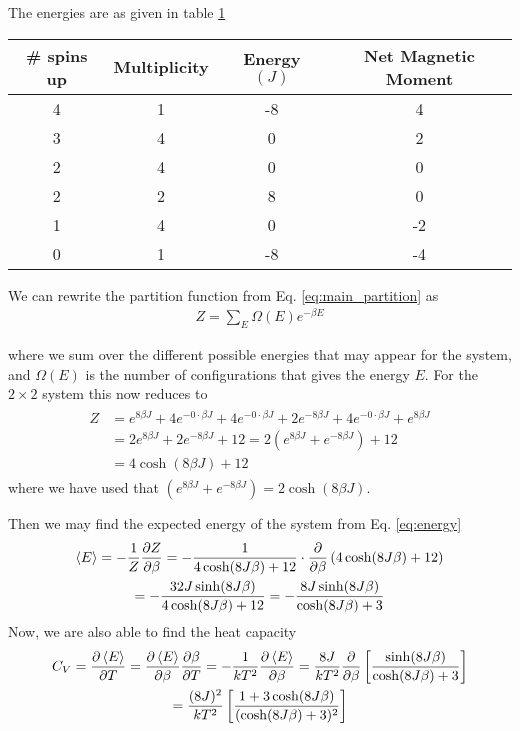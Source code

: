 \documentclass[11pt, a4paper]{article}
\newcommand{\pdiff}[2]{\frac{\partial #1}{\partial #2}}
\begin{document}
The energies are as given in table \ref{tab:energy}

\begin{table}[!ht]
\centering
\begin{tabular}{c|c|c|c}
\# spins up & Multiplicity & Energy $(J)$ & Net Magnetic Moment \\
\hline
4 & 1 & -8 & 4\\
3 & 4 & 0 & 2\\
2 & 4 & 0 & 0\\
2 & 2 & 8 & 0\\
1 & 4 & 0 & -2\\
0 & 1 & -8 & -4
\end{tabular}
\label{tab:energy}
\end{table}

We can rewrite the partition function from Eq. \eqref{eq:main_partition} as
\begin{gather}
Z = \sum\limits_E \Omega(E)e^{-\beta E}
\end{gather} 


where we sum over the different possible energies that may appear for the system, and $\Omega(E)$ is the number of configurations that gives the energy $E$. For the $2 \times 2$ system this now reduces to 
\begin{gather}
\begin{aligned}
Z &= e^{8\beta J} + 4 e^{-0\cdot\beta J} + 4e^{-0\cdot\beta J} + 2e^{-8\beta J} + 4e^{-0\cdot\beta J} + e^{8\beta J}\\
&= 2e^{8\beta J} + 2e^{-8\beta J} + 12 = 2(e^{8\beta J} + e^{-8\beta J}) + 12\\
&= 4\cosh(8\beta J) + 12
\end{aligned}
\end{gather}
where we have used that $(e^{8\beta J} + e^{-8\beta J}) = 2\cosh(8\beta J)$.

Then we may find the expected energy of the system from Eq. \eqref{eq:energy}
\begin{gather}
\braket{E} = -\frac{1}{Z}\pdiff{Z}{\beta} = -\frac{1}{4\cosh (8J\beta) + 12}\cdot\pdiff{}{\beta}\left(4\cosh (8J\beta) + 12\right)\\
 =  -\frac{32J\sinh(8J\beta)}{4\cosh (8J\beta) + 12}
 = -\frac{8J\sinh(8J\beta)}{\cosh (8J\beta) + 3}
\end{gather}
Now, we are also able to find the heat capacity
\begin{gather}
C_V = \pdiff{\braket{E}}{T} = \pdiff{\braket{E}}{\beta}\pdiff{\beta}{T} = -\frac{1}{kT^2}\pdiff{\braket{E}}{\beta} = \frac{8J}{kT^2} \pdiff{}{\beta}\left[\frac{\sinh(8J\beta)}{\cosh (8J\beta) + 3}\right]\\
= \frac{(8J)^2}{kT^2}\left[\frac{1+3\cosh(8J\beta)}{(\cosh (8J\beta) + 3)^2}\right]
\end{gather}
\end{document}
